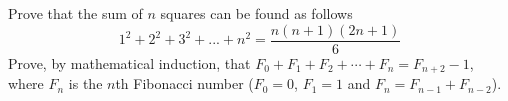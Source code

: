 \begin{questions}
\question Prove that the sum of $n$ squares can be found as follows\[1^2 +2^2 +3^2+...+n^2 = \frac{n(n+1)(2n+1)}{6}\]
%
%
%
%
%
\question  Prove, by mathematical induction, that $F_0 + F_1 + F_2 + \cdots + F_{n} = F_{n+2} - 1$, where $F_n$ is the $n$th Fibonacci number ($F_0 = 0$, $F_1 = 1$ and $F_n = F_{n-1} + F_{n-2}$).

\end{questions}
